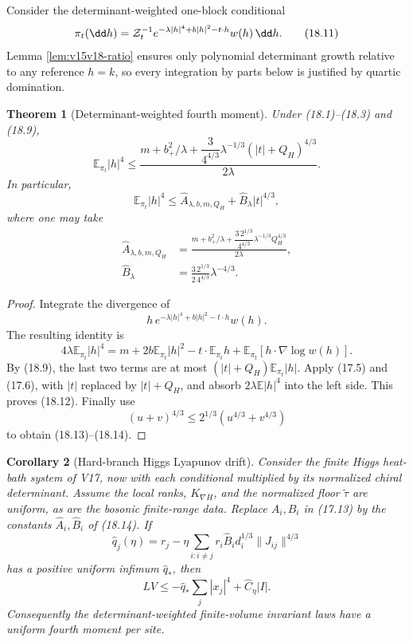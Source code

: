 \documentclass[11pt]{article}
\newtheorem{theorem}{Theorem}[section]
\newtheorem{corollary}[theorem]{Corollary}
\theoremstyle{remark}
\begin{document}
Consider the determinant-weighted one-block conditional
\[
 \pi_t(\dd h)
 =
 {\cal Z}_t^{-1}
 e^{-\lambda|h|^4+b|h|^2-t\cdot h}w(h)\,\dd h.              \tag{18.11}
\]
Lemma \ref{lem:v15v18-ratio} ensures only polynomial determinant
growth relative to any reference \(h=k\), so every integration by
parts below is justified by quartic domination.

\begin{theorem}[Determinant-weighted fourth moment]
\label{thm:v15v18-moment}
Under (18.1)--(18.3) and (18.9),
\[
\boxed{
 \mathbb E_{\pi_t}|h|^4
 \le
 \frac{
 m+b_+^2/\lambda+
 \dfrac{3}{4^{4/3}}\lambda^{-1/3}(|t|+Q_H)^{4/3}
 }{2\lambda}.}                                             \tag{18.12}
\]
In particular,
\[
 \mathbb E_{\pi_t}|h|^4
 \le
 \widehat A_{\lambda,b,m,Q_H}
 +\widehat B_\lambda |t|^{4/3},                             \tag{18.13}
\]
where one may take
\[
\begin{aligned}
 \widehat A_{\lambda,b,m,Q_H}
 &=
 \frac{
 m+b_+^2/\lambda+
 \dfrac{3\,2^{1/3}}{4^{4/3}}
 \lambda^{-1/3}Q_H^{4/3}
 }{2\lambda},\\
 \widehat B_\lambda
 &=
 \frac{3\,2^{1/3}}{2\,4^{4/3}}\lambda^{-4/3}.               \tag{18.14}
\end{aligned}
\]
\end{theorem}

\begin{proof}
Integrate the divergence of
\[
 h\,e^{-\lambda|h|^4+b|h|^2-t\cdot h}w(h).
\]
The resulting identity is
\[
 4\lambda\mathbb E_{\pi_t}|h|^4
 =
 m+2b\mathbb E_{\pi_t}|h|^2
 -t\cdot\mathbb E_{\pi_t}h
 +\mathbb E_{\pi_t}
   [h\cdot\nabla\log w(h)].                                 \tag{18.15}
\]
By (18.9), the last two terms are at most
\((|t|+Q_H)\mathbb E_{\pi_t}|h|\).  Apply (17.5) and
(17.6), with \(|t|\) replaced by \(|t|+Q_H\), and absorb
\(2\lambda\mathbb E|h|^4\) into the left side.  This proves
(18.12).  Finally use
\[
 (u+v)^{4/3}\le2^{1/3}(u^{4/3}+v^{4/3})
\]
to obtain (18.13)--(18.14).
\end{proof}

\begin{corollary}[Hard-branch Higgs Lyapunov drift]
\label{cor:v15v18-drift}
Consider the finite Higgs heat-bath system of V17, now with each
conditional multiplied by its normalized chiral determinant.
Assume the local ranks, \(K_{\nabla H}\), and the normalized floor
\(\widetilde\tau\) are uniform, as are the bosonic finite-range
data.  Replace \(A_i,B_i\) in (17.13) by the constants
\(\widehat A_i,\widehat B_i\) of (18.14).  If
\[
 \widehat q_j(\eta)
 =
 r_j-\eta\sum_{i:i\ne j}
 r_i\widehat B_i d_i^{1/3}\|J_{ij}\|^{4/3}
\]
has a positive uniform infimum \(\widehat q_*\), then
\[
 \boxed{
 LV
 \le
 -\widehat q_*\sum_j|x_j|^4+
 \widehat C_\eta|I|.}                                      \tag{18.16}
\]
Consequently the determinant-weighted finite-volume invariant laws
have a uniform fourth moment per site.
\end{corollary}
\end{document}
